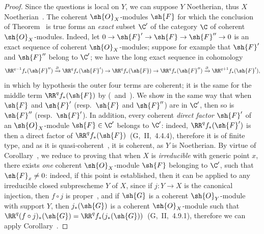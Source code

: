 \begin{proof}
Since the questions is local on $Y$, we can suppose $Y$ Noetherian, thus $X$ Noetherian~.
The coherent $\sh{O}_X$-modules $\sh{F}$ for which the conclusion of Theorem~ is true forms an \emph{exact} subset $\C'$ of the category $\C$ of coherent $\sh{O}_X$-modules.
Indeed, let $0\to\sh{F}'\to\sh{F}\to\sh{F}''\to 0$ is an exact sequence of coherent $\sh{O}_X$-modules; suppose for example that $\sh{F}'$ and $\sh{F}''$ belong to $\C'$; we have the long exact sequence in cohomology
\[
  \RR^{q-1}f_*(\sh{F}'')\xrightarrow{\partial}\RR^q f_*(\sh{F}')\to\RR^q f_*(\sh{F})\to\RR^q f_*(\sh{F}'')\xrightarrow{\partial}\RR^{q+1}f_*(\sh{F}'),
\]
in which by hypothesis the outer four terms are coherent; it is the same for the middle term $\RR^q f_*(\sh{F})$ by (~and~).
We show in the same way that when $\sh{F}$ and $\sh{F}'$ (resp.~$\sh{F}$ and $\sh{F}''$) are in $\C'$, then so is $\sh{F}''$ (resp.~$\sh{F}'$).
In addition, every coherent \emph{direct factor} $\sh{F}'$ of an $\sh{O}_X$-module $\sh{F}\in\C'$ belongs to $\C'$: indeed, $\RR^q f_*(\sh{F}')$ is then a direct factor of $\RR^q f_*(\sh{F})$~(G,~II,~4.4.4), therefore it is of finite type, and as it is quasi-coherent~, it is coherent, as $Y$ is Noetherian.
By virtue of Corollary~, we reduce to proving that when $X$ is \emph{irreducible} with generic point $x$, there exists \emph{one} coherent $\sh{O}_X$-module $\sh{F}$ belonging to $\C'$, such that $\sh{F}_x\neq 0$: indeed, if this point is established, then it can be applied to any irreducible closed subprescheme $Y$ of $X$, since if $j:Y\to X$ is the canonical injection, then $f\circ j$ is proper~, and if $\sh{G}$ is a coherent $\sh{O}_Y$-module with support $Y$, then $j_*(\sh{G})$ is a coherent $\sh{O}_X$-module such that $\RR^q(f\circ j)_*(\sh{G})=\RR^q f_*(j_*(\sh{G}))$~(G,~II,~4.9.1), therefore we can apply Corollary~.


\end{proof}
